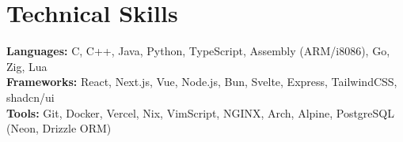 \documentclass[a4paper,10pt]{article}
\begin{document}
\section*{Technical Skills}
\textbf{Languages:} C, C++, Java, Python, TypeScript, Assembly (ARM/i8086), Go, Zig, Lua \\
\textbf{Frameworks:} React, Next.js, Vue, Node.js, Bun, Svelte, Express, TailwindCSS, shadcn/ui \\
\textbf{Tools:} Git, Docker, Vercel, Nix, VimScript, NGINX, Arch, Alpine, PostgreSQL (Neon, Drizzle ORM)\\
\end{document}
